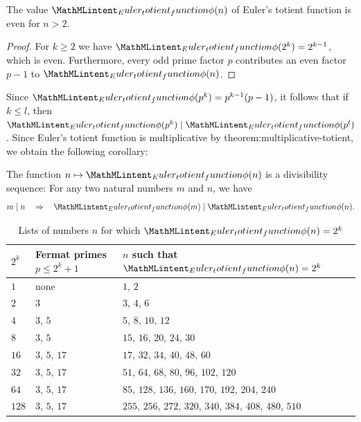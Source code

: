\begin{corollary}
  The value $\totient(n)$ of Euler's totient function is even for $n>2$.
\end{corollary}

\begin{proof}
  For $k\geq 2$ we have $\totient(2^k)=2^{k-1}$, which is even. Furthermore, every odd prime factor $p$ contributes an even factor $p-1$ to $\totient(n)$.
\end{proof}

Since $\totient(p^k)=p^{k-1}(p-1)$, it follows that if $k\leq l$, then $\totient(p^k)\mid \totient(p^l)$. Since Euler's totient function is multiplicative by {theorem:multiplicative-totient}, we obtain the following corollary:

\begin{corollary}
  The function $n\mapsto\totient(n)$ is a divisibility sequence: For any two natural numbers $m$ and $n$, we have
  \begin{equation*}
    m\mid n\quad\Rightarrow\quad \totient(m)\mid\totient(n).
  \end{equation*}
\end{corollary}

\begin{table}[t]
  \centering
  \begin{tabular}{l b{7em} l}
    $2^k$ & Fermat primes\newline $p\le 2^k+1$
    & $n$ such that $\totient(n)=2^k$ \\
    \midrule
    $1$   & none              & $1$, $2$ \\
    $2$   & $3$               & $3$, $4$, $6$ \\
    $4$   & $3$, $5$          & $5$, $8$, $10$, $12$ \\
    $8$   & $3$, $5$          & $15$, $16$, $20$, $24$, $30$ \\
    $16$  & $3$, $5$, $17$    & $17$, $32$, $34$, $40$, $48$, $60$ \\
    $32$  & $3$, $5$, $17$    & $51$, $64$, $68$, $80$, $96$, $102$, $120$ \\
    $64$  & $3$, $5$, $17$    & $85$, $128$, $136$, $160$, $170$, $192$, $204$, $240$ \\
    $128$ & $3$, $5$, $17$    & $255$, $256$, $272$, $320$, $340$, $384$, $408$, $480$, $510$
  \end{tabular}
  \caption{\label{table:totient-power-of-two}Lists of numbers $n$ for which $\totient(n)=2^k$}
\end{table}

